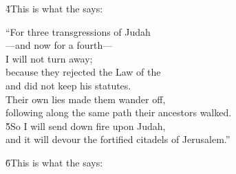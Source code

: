 \v{4}This is what the  says:

\begin{poetry}
\poeml ``For three transgressions of Judah \\
\poemll    ---and now for a fourth--- \\
\poemlll       I will not turn away; \\
\poeml because they rejected the Law of the  \\
\poemll    and did not keep his statutes. \\
\poeml Their own lies made them wander off, \\
\poemll    following along the same path their ancestors walked. \\
\poeml \v{5}So I will send down fire upon Judah, \\
\poemll    and it will devour the fortified citadels of Jerusalem.''
\end{poetry}

\v{6}This is what the  says:

